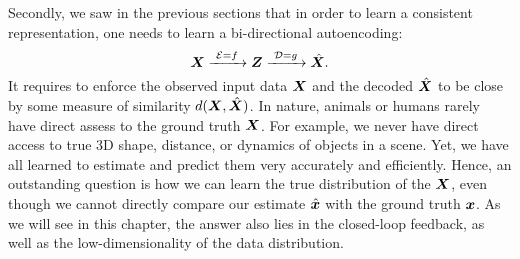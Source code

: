 \documentclass[../../book-main.tex]{subfiles}
\begin{document}
Secondly, we saw in the previous sections that in order to learn a consistent representation, one needs to learn a bi-directional autoencoding:
\begin{equation}
 \bm{X}
\xrightarrow{\hspace{1mm} \mathcal{E} = f \hspace{1mm}} \bm{Z}  \xrightarrow{\hspace{1mm} \mathcal{D} = g \hspace{1mm}} \hat{\bm{X}}.
\end{equation}
It requires to enforce the observed input data $\bm{X}$ and the decoded $\hat {\bm{X}}$ to be close by some measure of similarity $d(\bm{X}, \hat {\bm{X}})$. In nature, animals or humans rarely have direct assess to the ground truth $\bm{X}$. For example, we never have direct access to true 3D shape, distance, or dynamics of objects in a scene. Yet, we have all learned to estimate and predict them very accurately and efficiently. Hence, an outstanding question is how we can learn the true distribution of the $\bm{X}$, even though we cannot directly compare our estimate $\hat {\bm{x}}$ with the ground truth $\bm{x}$. As we will see in this chapter, the answer also  lies in the closed-loop feedback, as well as the low-dimensionality of the data distribution. 




\end{document}
